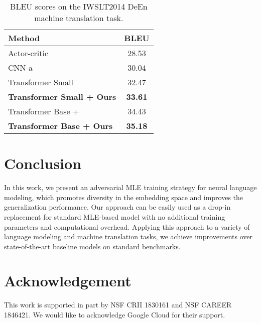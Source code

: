 \documentclass{article}
\begin{document}
\begin{table}[ht]
  	\begin{center}
  	\setlength\extrarowheight{1.5pt}
	\begin{tabular}{lc}
\toprule 
\bf  Method & \bf  BLEU \\
\hline
Actor-critic~\cite{bahdanau2016actor}  &  28.53 \\
CNN-a~\cite{gehring2016convolutional}  &  30.04\\
\hline
Transformer Small~\cite{vaswani2017attention} &  32.47 \\
\bf{Transformer Small + Ours} &  \bf 33.61 \\
\hline
Transformer Base + \cite{wang2018multiagent} &  34.43 \\
\bf{Transformer Base + Ours} &  \bf 35.18 \\
\bottomrule
\end{tabular}
\end{center}
\caption{\label{IWSLT-table} BLEU scores on the IWSLT2014 DeEn machine translation task. }
\end{table}


 
\section{Conclusion}
In this work, we present an adversarial MLE training strategy for  neural language modeling,  which promotes diversity in the embedding space and improves the generalization performance.
Our approach can be easily used as a drop-in  replacement for standard MLE-based model
with no additional training parameters and  computational overhead. 
Applying this approach to a variety of language modeling and machine translation tasks, we achieve improvements over state-of-the-art baseline models on standard benchmarks. 

\section*{Acknowledgement}
This work is supported in part by NSF CRII 1830161 and NSF  CAREER 1846421.
We would like to acknowledge Google Cloud for their support.




\end{document}
